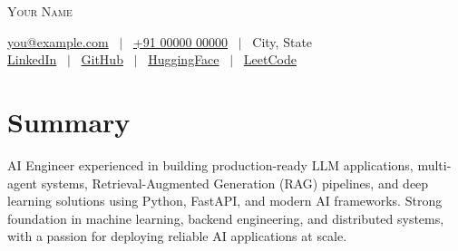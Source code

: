 \documentclass[a4paper,10pt]{article}
\begin{document}
\small

\begin{center}

    {\huge\scshape Your Name}
    \vspace{0.4ex}

    \href{mailto:you@example.com}{you@example.com} \ $\vert$ \
    \href{tel:+910000000000}{+91 00000 00000} \ $\vert$ \
    City, State \\
    \vspace{0.4ex}
    \href{https://www.linkedin.com/in/your-handle/}{LinkedIn} \ $\vert$ \
    \href{https://github.com/your-handle}{GitHub} \ $\vert$ \
    \href{https://huggingface.co/your-handle}{HuggingFace} \ $\vert$ \
    \href{https://leetcode.com/u/your-handle/}{LeetCode}
\end{center}

\section*{Summary}
AI Engineer experienced in building production-ready LLM applications, multi-agent systems, Retrieval-Augmented Generation (RAG) pipelines, and deep learning solutions using Python, FastAPI, and modern AI frameworks. Strong foundation in machine learning, backend engineering, and distributed systems, with a passion for deploying reliable AI applications at scale.

\end{document}
